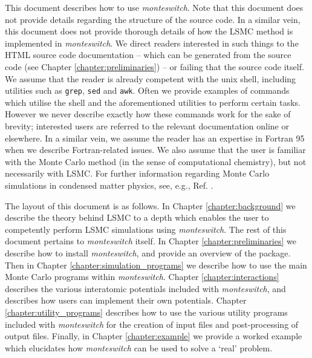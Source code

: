 \documentclass{report}
\begin{document}
This document describes how to use \emph{monteswitch}. Note that this document does not provide details regarding the structure of the source code. In a 
similar vein, this document does not provide thorough details of how the LSMC method is implemented in \emph{monteswitch}. We direct readers
interested in such things to the HTML source code documentation -- which can be generated from the source code (see Chapter
\ref{chapter:preliminaries}) -- or failing that the source code itself. We assume that the reader is already competent with the unix shell, 
including utilities such as \texttt{grep}, \texttt{sed} and \texttt{awk}. Often we provide examples of commands which utilise the shell and the 
aforementioned utilities to perform certain tasks. However we never describe exactly how these commands work for the sake of brevity; interested users are 
referred to the relevant documentation online or elsewhere. In a similar vein, we assume the reader has an expertise in Fortran 95 when we
describe Fortran-related issues. We also assume that the user is familiar with the Monte Carlo method (in the sense of computational
chemistry), but not necessarily with LSMC. For further information regarding Monte Carlo simulations in condensed 
matter physics, see, e.g., Ref. \cite{book:Frenkel}. 

The layout of this document is as follows. In Chapter \ref{chapter:background} we describe the theory behind LSMC to a depth which enables the user to 
competently perform LSMC simulations using \emph{monteswitch}. The rest of this document pertains to \emph{monteswitch} itself.
In Chapter \ref{chapter:preliminaries} we describe how to install \emph{monteswitch}, and provide
an overview of the package. Then in Chapter \ref{chapter:simulation_programs} we describe how to use the main Monte Carlo programs within
\emph{monteswitch}. Chapter \ref{chapter:interactions} describes the various interatomic potentials included with \emph{monteswitch}, and
describes how users can implement their own potentials. Chapter \ref{chapter:utility_programs} describes how to use the various utility
programs included with \emph{monteswitch} for the creation of input files and post-processing of output files. Finally, in Chapter \ref{chapter:example}
we provide a worked example which elucidates how \emph{monteswitch} can be used to solve a `real' problem. 




\end{document}
